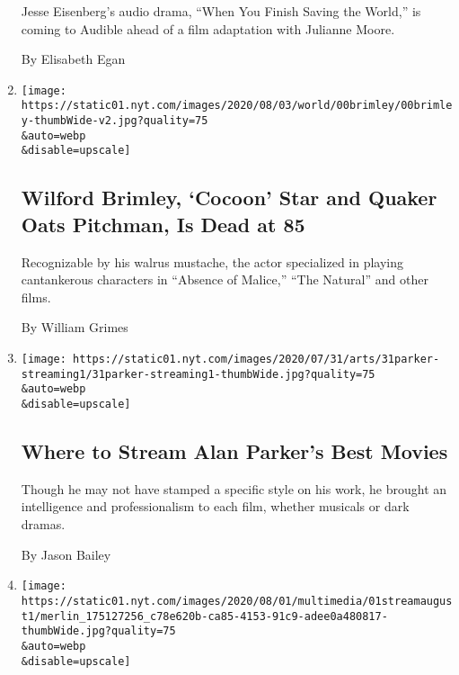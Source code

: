 \begin{enumerate}
  Jesse Eisenberg's audio drama, ``When You Finish Saving the World,''
  is coming to Audible ahead of a film adaptation with Julianne Moore.

  By Elisabeth Egan
\item
  \href{/2020/08/01/obituaries/wilford-brimley-dead.html}{}

  \texttt{[image: https://static01.nyt.com/images/2020/08/03/world/00brimley/00brimley-thumbWide-v2.jpg?quality=75\\\&auto=webp\\\&disable=upscale]}

  \hypertarget{wilford-brimley-cocoon-star-and-quaker-oats-pitchman-is-dead-at-85}{%
  \subsection{Wilford Brimley, `Cocoon' Star and Quaker Oats Pitchman,
  Is Dead at
  85}\label{wilford-brimley-cocoon-star-and-quaker-oats-pitchman-is-dead-at-85}}

  Recognizable by his walrus mustache, the actor specialized in playing
  cantankerous characters in ``Absence of Malice,'' ``The Natural'' and
  other films.

  By William Grimes
\item
  \href{/2020/07/31/movies/alan-parker-stream.html}{}

  \texttt{[image: https://static01.nyt.com/images/2020/07/31/arts/31parker-streaming1/31parker-streaming1-thumbWide.jpg?quality=75\\\&auto=webp\\\&disable=upscale]}

  \hypertarget{where-to-stream-alan-parkers-best-movies}{%
  \subsection{Where to Stream Alan Parker's Best
  Movies}\label{where-to-stream-alan-parkers-best-movies}}

  Though he may not have stamped a specific style on his work, he
  brought an intelligence and professionalism to each film, whether
  musicals or dark dramas.

  By Jason Bailey
\item
  \href{/2020/07/31/arts/television/new-to-stream-netflix.html}{}

  \texttt{[image: https://static01.nyt.com/images/2020/08/01/multimedia/01streamaugust1/merlin\_175127256\_c78e620b-ca85-4153-91c9-adee0a480817-thumbWide.jpg?quality=75\\\&auto=webp\\\&disable=upscale]}

  \hypertarget{the-best-movies-and-tv-shows-coming-to-netflix-amazon-and-more-in-august}{%
}
\end{enumerate}
